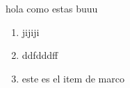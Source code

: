 \documentclass[12pt]{article}
\begin{document}
hola como estas buuu
\begin{enumerate}
    \item jijiji
    \item ddfdddff
    \item este es el item de marco 
    
\end{enumerate}
\end{document}
